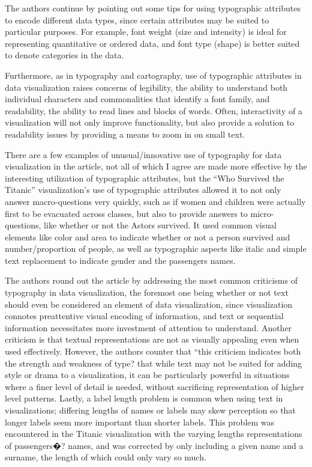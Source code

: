 \documentclass[]{book}
\theoremstyle{definition}
\theoremstyle{definition}
\theoremstyle{definition}
\theoremstyle{remark}
\begin{document}
The authors continue by pointing out some tips for using typographic
attributes to encode different data types, since certain attributes may
be suited to particular purposes. For example, font weight (size and
intensity) is ideal for representing quantitative or ordered data, and
font type (shape) is better suited to denote categories in the data.

Furthermore, as in typography and cartography, use of typographic
attributes in data visualization raises concerns of legibility, the
ability to understand both individual characters and commonalities that
identify a font family, and readability, the ability to read lines and
blocks of words. Often, interactivity of a visualization will not only
improve functionality, but also provide a solution to readability issues
by providing a means to zoom in on small text.

There are a few examples of unusual/innovative use of typography for
data visualization in the article, not all of which I agree are made
more effective by the interesting utilization of typographic attributes,
but the ``Who Survived the Titanic'' visualization's use of typographic
attributes allowed it to not only answer macro-questions very quickly,
such as if women and children were actually first to be evacuated across
classes, but also to provide answers to micro-questions, like whether or
not the Astors survived. It used common visual elements like color and
area to indicate whether or not a person survived and number/proportion
of people, as well as typographic aspects like italic and simple text
replacement to indicate gender and the passengers names.

The authors round out the article by addressing the most common
criticisms of typography in data visualization, the foremost one being
whether or not text should even be considered an element of data
visualization, since visualization connotes preattentive visual encoding
of information, and text or sequential information necessitates more
investment of attention to understand. Another criticism is that textual
representations are not as visually appealing even when used
effectively. However, the authors counter that ``this criticism
indicates both the strength and weakness of type? that while text may
not be suited for adding style or drama to a visualization, it can be
particularly powerful in situations where a finer level of detail is
needed, without sacrificing representation of higher level patterns.
Lastly, a label length problem is common when using text in
visualizations; differing lengths of names or labels may skew perception
so that longer labels seem more important than shorter labels. This
problem was encountered in the Titanic visualization with the varying
lengths representations of passengers�? names, and was corrected by only
including a given name and a surname, the length of which could only
vary so much.
\end{document}
